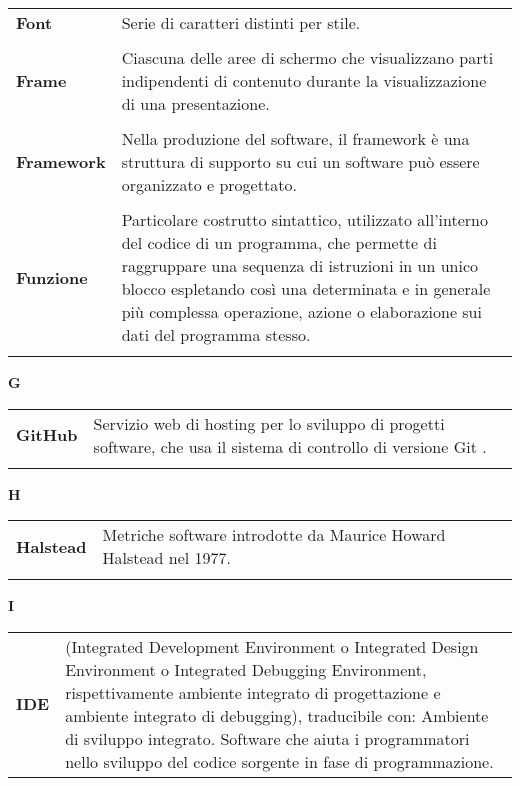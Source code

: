 {\begin{longtable}{L{4cm} p{10cm}}
 \\ 
\textbf{Font} & Serie di caratteri distinti per stile. \\ 
 \\ 
\textbf{Frame} & Ciascuna delle aree di schermo che visualizzano parti indipendenti di contenuto durante la visualizzazione di una presentazione. \\ 
 \\ 
\textbf{Framework} & Nella produzione del software, il framework è una struttura di supporto su cui un software può essere organizzato e progettato. \\ 
 \\ 
\textbf{Funzione} & Particolare costrutto sintattico, utilizzato all’interno del codice di un programma, che permette di raggruppare una sequenza di istruzioni in un unico blocco espletando così una determinata e in generale più complessa operazione, azione o elaborazione sui dati del programma stesso. \\ 
 \\ 
\end{longtable} 
\newpage 
{} 
{} 
\hfill\Huge{\textbf{G}} \\ 
\normalsize 
\begin{longtable}{L{4cm} p{10cm}}
\textbf{GitHub} & Servizio web di hosting per lo sviluppo di progetti software, che usa il sistema di controllo di versione Git . \\ 
 \\ 
\end{longtable} 
\newpage 
{} 
{} 
\hfill\Huge{\textbf{H}} \\ 
\normalsize 
\begin{longtable}{L{4cm} p{10cm}}
\textbf{Halstead} & Metriche software introdotte da Maurice Howard Halstead nel 1977. \\ 
 \\ 
\end{longtable} 
\newpage 
{} 
{} 
\hfill\Huge{\textbf{I}} \\ 
\normalsize 
\begin{longtable}{L{4cm} p{10cm}}
\textbf{IDE} & (Integrated Development Environment o Integrated Design Environment o Integrated Debugging Environment, rispettivamente ambiente integrato di progettazione e ambiente integrato di debugging), traducibile con: Ambiente di sviluppo integrato. Software che aiuta i programmatori nello sviluppo del codice sorgente in fase di programmazione. \\ 

\end{longtable}}
